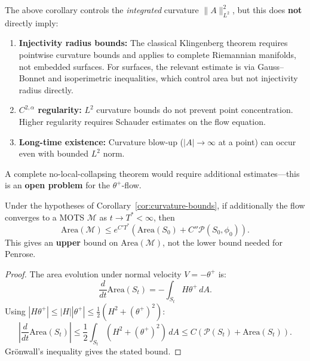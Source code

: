 \begin{remark}
\label{rem:no-collapse-gap}
The above corollary controls the \emph{integrated} curvature $\|A\|_{L^2}^2$, but this does \textbf{not} directly imply:
\begin{enumerate}[label=(\roman*)]
\item \textbf{Injectivity radius bounds:} The classical Klingenberg theorem requires pointwise curvature bounds and applies to complete Riemannian manifolds, not embedded surfaces. For surfaces, the relevant estimate is via Gauss--Bonnet and isoperimetric inequalities, which control area but not injectivity radius directly.
\item \textbf{$C^{2,\alpha}$ regularity:} $L^2$ curvature bounds do not prevent point concentration. Higher regularity requires Schauder estimates on the flow equation.
\item \textbf{Long-time existence:} Curvature blow-up ($|A| \to \infty$ at a point) can occur even with bounded $L^2$ norm.
\end{enumerate}
A complete no-local-collapsing theorem would require additional estimates---this is an \textbf{open problem} for the $\theta^+$-flow.
\end{remark}

\begin{corollary}
\label{cor:weak-area}
Under the hypotheses of Corollary~\ref{cor:curvature-bounds}, if additionally the flow converges to a MOTS $\mathcal{M}$ as $t \to T^* < \infty$, then
\begin{equation}
\mathrm{Area}(\mathcal{M}) \leq e^{C'T^*}\left(\mathrm{Area}(S_0) + C''\mathcal{P}(S_0, \phi_0)\right).
\end{equation}
This gives an \textbf{upper} bound on $\mathrm{Area}(\mathcal{M})$, not the lower bound needed for Penrose.
\end{corollary}

\begin{proof}
The area evolution under normal velocity $V = -\theta^+$ is:
\begin{equation}
\frac{d}{dt}\mathrm{Area}(S_t) = -\int_{S_t} H\theta^+ \, dA.
\end{equation}
Using $|H\theta^+| \leq |H||\theta^+| \leq \frac{1}{2}(H^2 + (\theta^+)^2)$:
\begin{equation}
\left|\frac{d}{dt}\mathrm{Area}(S_t)\right| \leq \frac{1}{2}\int_{S_t} (H^2 + (\theta^+)^2) \, dA \leq C(\mathcal{P}(S_t) + \mathrm{Area}(S_t)).
\end{equation}
Gr\"onwall's inequality gives the stated bound.
\end{proof}

